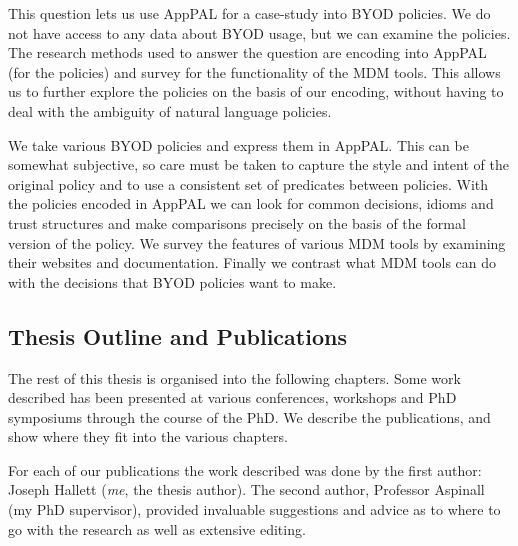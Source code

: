 \documentclass[thesis.tex]{subfiles}
\begin{document}
\begin{itemize}
  This question lets us use AppPAL for a case-study into \ac{BYOD}
  policies.  We do not have access to any data about \ac{BYOD} usage,
  but we can examine the policies.  The research methods used to answer
  the question are encoding into AppPAL (for the policies) and survey
  for the functionality of the \ac{MDM} tools.  This allows us to
  further explore the policies on the basis of our encoding, without
  having to deal with the ambiguity of natural language policies.
  
  We take various \ac{BYOD} policies and express them in AppPAL.  This
  can be somewhat subjective, so care must be taken to capture the style
  and intent of the original policy and to use a consistent set of
  predicates between policies.  With the policies encoded in AppPAL we
  can look for common decisions, idioms and trust structures and make
  comparisons precisely on the basis of the formal version of the
  policy.  We survey the features of various \ac{MDM} tools by examining
  their websites and documentation.  Finally we contrast what \ac{MDM}
  tools can do with the decisions that \ac{BYOD} policies want to make.
\end{itemize}



\subsection{Thesis Outline and Publications}

The rest of this thesis is organised into the following chapters.  Some work
described has been presented at various conferences, workshops and PhD
symposiums through the course of the PhD.  We describe the publications, and
show where they fit into the various chapters.

For each of our publications the work described was done by the first
author: Joseph Hallett (\emph{me}, the thesis author).  The second
author, Professor Aspinall (my PhD supervisor), provided invaluable
suggestions and advice as to where to go with the research as well as
extensive editing.
\end{document}

